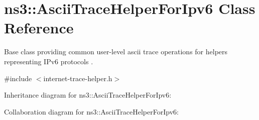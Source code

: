 \hypertarget{classns3_1_1AsciiTraceHelperForIpv6}{}\section{ns3\+:\+:Ascii\+Trace\+Helper\+For\+Ipv6 Class Reference}
\label{classns3_1_1AsciiTraceHelperForIpv6}


Base class providing common user-\/level ascii trace operations for helpers representing I\+Pv6 protocols .  




{\ttfamily \#include $<$internet-\/trace-\/helper.\+h$>$}



Inheritance diagram for ns3\+:\+:Ascii\+Trace\+Helper\+For\+Ipv6\+:


Collaboration diagram for ns3\+:\+:Ascii\+Trace\+Helper\+For\+Ipv6\+:
